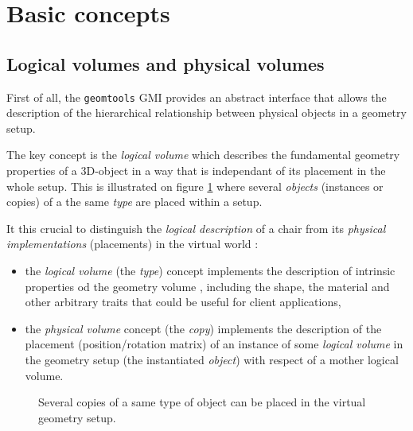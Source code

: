 
\section{Basic concepts}

\subsection{Logical volumes and physical volumes}

\pn  First of  all, the  \texttt{geomtools} GMI  provides  an abstract
interface that allows the description of the hierarchical relationship
between physical objects in a geometry setup.

\pn The key  concept is the \emph{logical volume}  which describes the
fundamental  geometry properties  of  a  3D-object in  a  way that  is
independant of its  placement in the whole setup.  This is illustrated
on figure  \ref{fig:lv:0} where  several \emph{objects} (instances or copies)  of a
the same \emph{type} are placed within a setup.

It  this crucial to  distinguish the  \emph{logical description}  of a
chair  from its \emph{physical  implementations} (placements)  in the
  virtual world :
  \begin{itemize}

  \item the \emph{logical volume} (the \emph{type}) concept implements the description of
    intrinsic properties od the geometry volume , including the shape, the material and other
    arbitrary traits that could be useful for client applications,

  \item the  \emph{physical volume} concept (the \emph{copy}) implements the description
    of the placement (position/rotation matrix) of an instance of some
    \emph{logical  volume}  in the  geometry  setup (the  instantiated
    \emph{object}) with respect of a mother logical volume.

  \end{itemize}

\begin{figure}[h]
\begin{center}
\scalebox{0.75}{}
\end{center}
\caption{Several copies of a same type of object can be placed in the virtual
geometry setup.}\label{fig:lv:0}
\end{figure}

